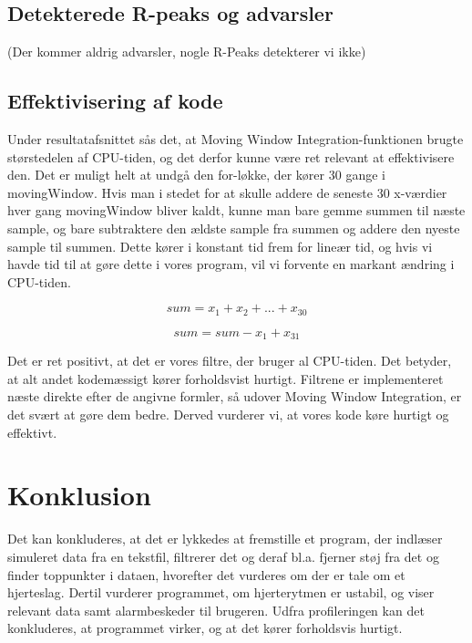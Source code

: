 \documentclass{article}
\begin{document}
\subsection{Detekterede R-peaks og advarsler}
(Der kommer aldrig advarsler, nogle R-Peaks detekterer vi ikke)

\subsection{Effektivisering af kode}
Under resultatafsnittet sås det, at Moving Window Integration-funktionen brugte størstedelen af CPU-tiden, og det derfor kunne være ret relevant at effektivisere den. 
Det er muligt helt at undgå den for-løkke, der kører 30 gange i movingWindow. Hvis man i stedet for at skulle addere de seneste 30 x-værdier hver gang movingWindow bliver kaldt, kunne man bare gemme summen til næste sample, og bare subtraktere den ældste sample fra summen og addere den nyeste sample til summen. Dette kører i konstant tid frem for lineær tid, og hvis vi havde tid til at gøre dette i vores program, vil vi forvente en markant ændring i CPU-tiden.

\begin{equation}
sum = x_1+x_2+...+x_{30}
\end{equation}

\begin{equation}
sum = sum-x_1+x_{31}
\end{equation}

Det er ret positivt, at det er vores filtre, der bruger al CPU-tiden. Det betyder, at alt andet kodemæssigt kører forholdsvist hurtigt. Filtrene er implementeret næste direkte efter de angivne formler, så udover Moving Window Integration, er det svært at gøre dem bedre. Derved vurderer vi, at vores kode køre hurtigt og effektivt.


\newpage
\section{Konklusion}
Det kan konkluderes, at det er lykkedes at fremstille et program, der indlæser simuleret data fra en tekstfil, filtrerer det og deraf bl.a. fjerner støj fra det og finder toppunkter i dataen, hvorefter det vurderes om der er tale om et hjerteslag. Dertil vurderer programmet, om hjerterytmen er ustabil, og viser relevant data samt alarmbeskeder til brugeren. Udfra profileringen kan det konkluderes, at programmet virker, og at det kører forholdsvis hurtigt.

\newpage
\end{document}
